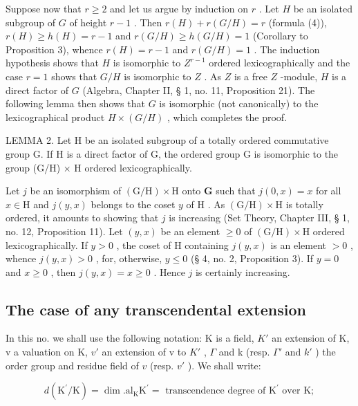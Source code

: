 Suppose now that \(r \geqslant 2\) and let us argue by induction on \(r\) . Let \(H\) be an isolated subgroup of \(G\) of height \(r - 1\) . Then \(r(H) + r(G/H) = r\) (formula (4)), \(r(H) \geqslant h(H) = r - 1\) and \(r(G/H) \geqslant h(G/H) = 1\) (Corollary to Proposition 3), whence \(r(H) = r - 1\) and \(r(G/H) = 1\) . The induction hypothesis shows that \(H\) is isomorphic to \(Z^{r-1}\) ordered lexicographically and the case \(r = 1\) shows that \(G/H\) is isomorphic to \(Z\) . As \(Z\) is a free \(Z\) -module, \(H\) is a direct factor of \(G\) (Algebra, Chapter II, § 1, no. 11, Proposition 21). The following lemma then shows that \(G\) is isomorphic (not canonically) to the lexicographical product \(H \times (G/H)\) , which completes the proof.

LEMMA 2. Let H be an isolated subgroup of a totally ordered commutative group G. If H is a direct factor of G, the ordered group G is isomorphic to the group (G/H) × H ordered lexicographically.

Let \(j\) be an isomorphism of \((\mathrm{G} / \mathrm{H}) \times \mathrm{H}\) onto \(\mathbf{G}\) such that \(j(0, x) = x\) for all \(x \in \mathrm{H}\) and \(j(y, x)\) belongs to the coset \(y\) of \(\mathrm{H}\) . As \((\mathrm{G} / \mathrm{H}) \times \mathrm{H}\) is totally ordered, it amounts to showing that \(j\) is increasing (Set Theory, Chapter III, § 1, no. 12, Proposition 11). Let \((y, x)\) be an element \(\geqslant 0\) of \((\mathrm{G} / \mathrm{H}) \times \mathrm{H}\) ordered lexicographically. If \(y > 0\) , the coset of \(\mathrm{H}\) containing \(j(y, x)\) is an element \(> 0\) , whence \(j(y, x) > 0\) , for, otherwise, \(y \leqslant 0\) (§ 4, no. 2, Proposition 3). If \(y = 0\) and \(x \geqslant 0\) , then \(j(y, x) = x \geqslant 0\) . Hence \(j\) is certainly increasing.

\subsection{The case of any transcendental extension}

In this no. we shall use the following notation: K is a field, \(K'\) an extension of K, v a valuation on K, \(v'\) an extension of v to \(K'\) , \(\Gamma\) and k (resp. \(\Gamma'\) and \(k'\) ) the order group and residue field of \(v\) (resp. \(v'\) ). We shall write:

\[
d \left(\mathrm{K} ^ {\prime} / \mathrm{K}\right) = \dim . \mathrm{al} _ {\mathrm{K}} \mathrm{K} ^ {\prime} = \text { transcendence   degree   of } \mathrm{K} ^ {\prime} \text { over } \mathrm{K};
\]

